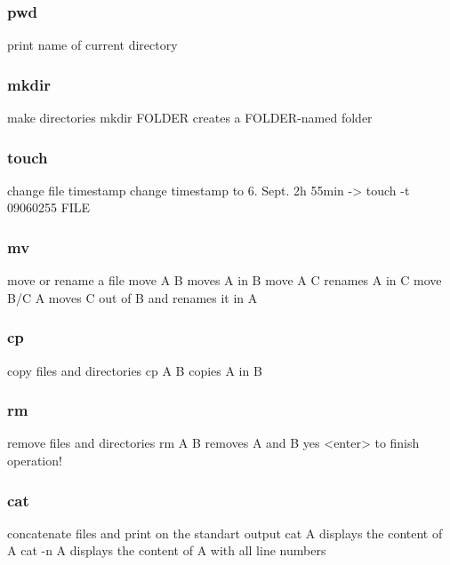 \documentclass[10pt,a4paper]{scrartcl}
\begin{document}
\begin{description}
\subsubsection{pwd}
\begin{terminalcode}
print name of current directory
\end{terminalcode}

\subsubsection{mkdir}
\begin{terminalcode}
make directories
mkdir FOLDER creates a FOLDER-named folder
\end{terminalcode}

\subsubsection{touch}
\begin{terminalcode}
change file timestamp
change timestamp to 6. Sept. 2h 55min -> touch -t 09060255 FILE
\end{terminalcode}

\subsubsection{mv}
\begin{terminalcode}
move or rename a file
move A B moves A in B
move A C renames A in C
move B/C A moves C out of B and renames it in A
\end{terminalcode}

\subsubsection{cp}
\begin{terminalcode}
copy files and directories
cp A B copies A in B
\end{terminalcode}

\subsubsection{rm}
\begin{terminalcode}
remove files and directories
rm A B removes A and B
yes <enter> to finish operation!
\end{terminalcode}

\subsubsection{cat}
\begin{terminalcode}
concatenate files and print on the standart output
cat A displays the content of A
cat -n A displays the content of A with all line numbers
\end{terminalcode}


\end{description}
\end{document}
